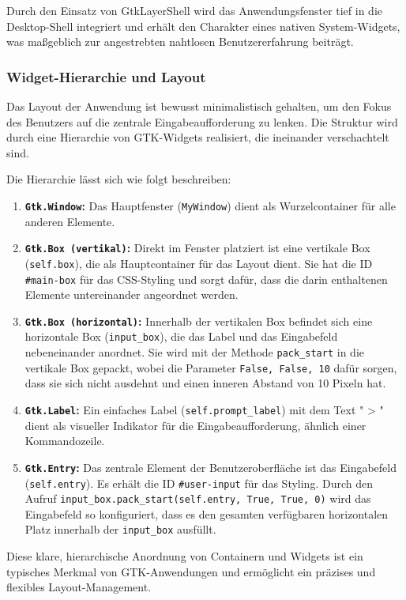 Durch den Einsatz von GtkLayerShell wird das Anwendungsfenster tief in die Desktop-Shell integriert und erhält den Charakter eines nativen System-Widgets, was maßgeblich zur angestrebten nahtlosen Benutzererfahrung beiträgt.
\subsubsection{Widget-Hierarchie und Layout}
Das Layout der Anwendung ist bewusst minimalistisch gehalten, um den Fokus des Benutzers auf die zentrale Eingabeaufforderung zu lenken. Die Struktur wird durch eine Hierarchie von GTK-Widgets realisiert, die ineinander verschachtelt sind.



Die Hierarchie lässt sich wie folgt beschreiben:
\begin{enumerate}
	\item \textbf{\texttt{Gtk.Window}:} Das Hauptfenster (\texttt{MyWindow}) dient als Wurzelcontainer für alle anderen Elemente.
	\item \textbf{\texttt{Gtk.Box (vertikal)}:} Direkt im Fenster platziert ist eine vertikale Box (\texttt{self.box}), die als Hauptcontainer für das Layout dient. Sie hat die ID \texttt{\#main-box} für das CSS-Styling und sorgt dafür, dass die darin enthaltenen Elemente untereinander angeordnet werden.
	\item \textbf{\texttt{Gtk.Box (horizontal)}:} Innerhalb der vertikalen Box befindet sich eine horizontale Box (\texttt{input\_box}), die das Label und das Eingabefeld nebeneinander anordnet. Sie wird mit der Methode \texttt{pack\_start} in die vertikale Box gepackt, wobei die Parameter \texttt{False, False, 10} dafür sorgen, dass sie sich nicht ausdehnt und einen inneren Abstand von 10 Pixeln hat.
	\item \textbf{\texttt{Gtk.Label}:} Ein einfaches Label (\texttt{self.prompt\_label}) mit dem Text " > " dient als visueller Indikator für die Eingabeaufforderung, ähnlich einer Kommandozeile.
	\item \textbf{\texttt{Gtk.Entry}:} Das zentrale Element der Benutzeroberfläche ist das Eingabefeld (\texttt{self.entry}). Es erhält die ID \texttt{\#user-input} für das Styling. Durch den Aufruf \texttt{input\_box.pack\_start(self.entry, True, True, 0)} wird das Eingabefeld so konfiguriert, dass es den gesamten verfügbaren horizontalen Platz innerhalb der \texttt{input\_box} ausfüllt.
\end{enumerate}
Diese klare, hierarchische Anordnung von Containern und Widgets ist ein typisches Merkmal von GTK-Anwendungen und ermöglicht ein präzises und flexibles Layout-Management.

